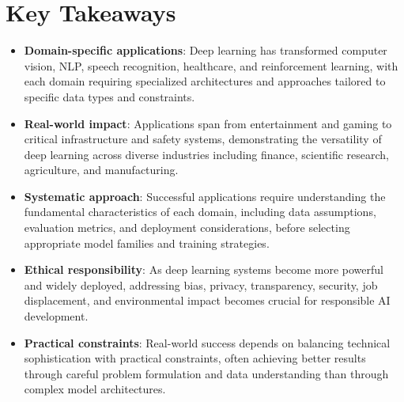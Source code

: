 
\section*{Key Takeaways}

\begin{keytakeaways}
\begin{itemize}[leftmargin=2em]
    \item \textbf{Domain-specific applications}: Deep learning has transformed computer vision, NLP, speech recognition, healthcare, and reinforcement learning, with each domain requiring specialized architectures and approaches tailored to specific data types and constraints.
    \item \textbf{Real-world impact}: Applications span from entertainment and gaming to critical infrastructure and safety systems, demonstrating the versatility of deep learning across diverse industries including finance, scientific research, agriculture, and manufacturing.
    \item \textbf{Systematic approach}: Successful applications require understanding the fundamental characteristics of each domain, including data assumptions, evaluation metrics, and deployment considerations, before selecting appropriate model families and training strategies.
    \item \textbf{Ethical responsibility}: As deep learning systems become more powerful and widely deployed, addressing bias, privacy, transparency, security, job displacement, and environmental impact becomes crucial for responsible AI development.
    \item \textbf{Practical constraints}: Real-world success depends on balancing technical sophistication with practical constraints, often achieving better results through careful problem formulation and data understanding than through complex model architectures.
\end{itemize}
\end{keytakeaways}


